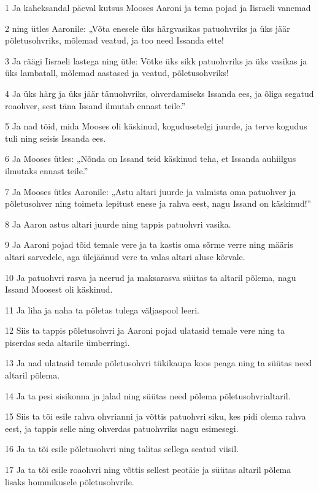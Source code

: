 \par 1 Ja kaheksandal päeval kutsus Mooses Aaroni ja tema pojad ja Iisraeli vanemad
\par 2 ning ütles Aaronile: „Võta enesele üks härgvasikas patuohvriks ja üks jäär põletusohvriks, mõlemad veatud, ja too need Issanda ette!
\par 3 Ja räägi Iisraeli lastega ning ütle: Võtke üks sikk patuohvriks ja üks vasikas ja üks lambatall, mõlemad aastased ja veatud, põletusohvriks!
\par 4 Ja üks härg ja üks jäär tänuohvriks, ohverdamiseks Issanda ees, ja õliga segatud roaohver, sest täna Issand ilmutab ennast teile.”
\par 5 Ja nad tõid, mida Mooses oli käskinud, kogudusetelgi juurde, ja terve kogudus tuli ning seisis Issanda ees.
\par 6 Ja Mooses ütles: „Nõnda on Issand teid käskinud teha, et Issanda auhiilgus ilmutaks ennast teile.”
\par 7 Ja Mooses ütles Aaronile: „Astu altari juurde ja valmista oma patuohver ja põletusohver ning toimeta lepitust enese ja rahva eest, nagu Issand on käskinud!”
\par 8 Ja Aaron astus altari juurde ning tappis patuohvri vasika.
\par 9 Ja Aaroni pojad tõid temale vere ja ta kastis oma sõrme verre ning määris altari sarvedele, aga ülejäänud vere ta valas altari aluse kõrvale.
\par 10 Ja patuohvri rasva ja neerud ja maksarasva süütas ta altaril põlema, nagu Issand Moosest oli käskinud.
\par 11 Ja liha ja naha ta põletas tulega väljaspool leeri.
\par 12 Siis ta tappis põletusohvri ja Aaroni pojad ulatasid temale vere ning ta piserdas seda altarile ümberringi.
\par 13 Ja nad ulatasid temale põletusohvri tükikaupa koos peaga ning ta süütas need altaril põlema.
\par 14 Ja ta pesi sisikonna ja jalad ning süütas need põlema põletusohvrialtaril.
\par 15 Siis ta tõi esile rahva ohvrianni ja võttis patuohvri siku, kes pidi olema rahva eest, ja tappis selle ning ohverdas patuohvriks nagu esimesegi.
\par 16 Ja ta tõi esile põletusohvri ning talitas sellega seatud viisil.
\par 17 Ja ta tõi esile roaohvri ning võttis sellest peotäie ja süütas altaril põlema lisaks hommikusele põletusohvrile.
